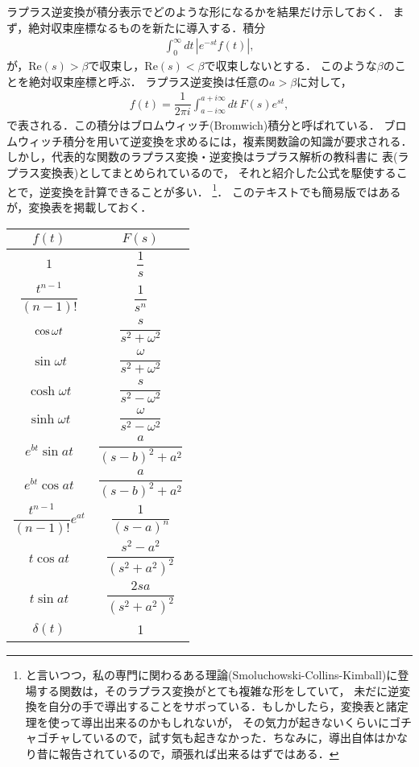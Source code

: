 ラプラス逆変換が積分表示でどのような形になるかを結果だけ示しておく．
まず，絶対収束座標なるものを新たに導入する．積分
\begin{align}
 \int_{0}^{\infty}dt\,\left|e^{-st}f(t)\right|, 
\end{align}
が，$\mathrm{Re}(s)>\beta$で収束し，$\mathrm{Re}(s)<\beta$で収束しないとする．
このような$\beta$のことを絶対収束座標と呼ぶ．
ラプラス逆変換は任意の$a>\beta$に対して，
\begin{align}
 f(t) = \dfrac{1}{2\pi i}\int_{a-i\infty}^{a+i\infty}dt\, F(s)e^{st}, 
\end{align}
で表される．この積分はブロムウィッチ(Bromwich)積分と呼ばれている．
ブロムウィッチ積分を用いて逆変換を求めるには，複素関数論の知識が要求される．
しかし，代表的な関数のラプラス変換・逆変換はラプラス解析の教科書に
表(ラプラス変換表)としてまとめられているので，
それと紹介した公式を駆使することで，逆変換を計算できることが多い．
\footnote{と言いつつ，私の専門に関わるある理論(Smoluchowski-Collins-Kimball)に登場する関数は，そのラプラス変換がとても複雑な形をしていて，
未だに逆変換を自分の手で導出することをサボっている．もしかしたら，変換表と諸定理を使って導出出来るのかもしれないが，
その気力が起きないくらいにゴチャゴチャしているので，試す気も起きなかった．ちなみに，導出自体はかなり昔に報告されているので，頑張れば出来るはずではある．}．
このテキストでも簡易版ではあるが，変換表を掲載しておく．
\begin{table}[htbp]
\centering
\renewcommand{\arraystretch}{1.2}
\begin{tabular}{c|c}
\hline
\hline 
$f\left(t\right)$ & $F\left(s\right)$\tabularnewline
\hline 
$1$ & $\dfrac{1}{s}$\tabularnewline
$\dfrac{t^{n-1}}{\left(n-1\right)!}$ & $\dfrac{1}{s^{n}}$\tabularnewline
$\cos\text{\ensuremath{\omega}}t$ & $\dfrac{s}{s^{2}+\omega^{2}}$\tabularnewline
$\sin\omega t$ & $\dfrac{\omega}{s^{2}+\omega^{2}}$\tabularnewline
$\cosh\omega t$ & $\dfrac{s}{s^{2}-\omega^{2}}$\tabularnewline
$\sinh\omega t$ & $\dfrac{\omega}{s^{2}-\omega^{2}}$\tabularnewline
$e^{bt}\sin at$ & $\dfrac{a}{\left(s-b\right)^{2}+a^{2}}$\tabularnewline
$e^{bt}\cos at$ & $\dfrac{a}{\left(s-b\right)^{2}+a^{2}}$\tabularnewline
$\dfrac{t^{n-1}}{\left(n-1\right)!}e^{at}$ & $\dfrac{1}{\left(s-a\right)^{n}}$\tabularnewline
$t\cos at$ & $\dfrac{s^{2}-a^{2}}{\left(s^{2}+a^{2}\right)^{2}}$\tabularnewline
$t\sin at$ & $\dfrac{2sa}{\left(s^{2}+a^{2}\right)^{2}}$\tabularnewline
$\delta\left(t\right)$ & 1\tabularnewline
\hline 
\end{tabular} 
\end{table}
%
\clearpage
